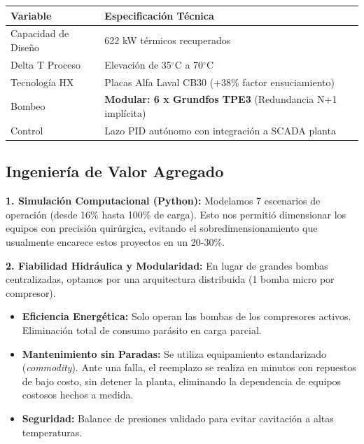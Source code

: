 \documentclass[11pt,letterpaper]{article}
\begin{document}
\begin{table}[h]
\centering
\small
\renewcommand{\arraystretch}{1.2}
\begin{tabular}{@{}ll@{}}
\toprule
\textbf{Variable} & \textbf{Especificación Técnica} \\
\midrule
Capacidad de Diseño & 622 kW térmicos recuperados \\
Delta T Proceso & Elevación de 35$^{\circ}$C a 70$^{\circ}$C \\
Tecnología HX & Placas Alfa Laval CB30 (+38\% factor ensuciamiento) \\
Bombeo & \textbf{Modular: 6 x Grundfos TPE3} (Redundancia N+1 implícita) \\
Control & Lazo PID autónomo con integración a SCADA planta \\
\bottomrule
\end{tabular}
\end{table}

\subsection{Ingeniería de Valor Agregado}

\textbf{1. Simulación Computacional (Python):}
Modelamos 7 escenarios de operación (desde 16\% hasta 100\% de carga). Esto nos permitió dimensionar los equipos con precisión quirúrgica, evitando el sobredimensionamiento que usualmente encarece estos proyectos en un 20-30\%.

\textbf{2. Fiabilidad Hidráulica y Modularidad:}
En lugar de grandes bombas centralizadas, optamos por una arquitectura distribuida (1 bomba micro por compresor).
\begin{itemize}[leftmargin=*, label=$\checkmark$]
    \item \textbf{Eficiencia Energética:} Solo operan las bombas de los compresores activos. Eliminación total de consumo parásito en carga parcial.
    \item \textbf{Mantenimiento sin Paradas:} Se utiliza equipamiento estandarizado (\textit{commodity}). Ante una falla, el reemplazo se realiza en minutos con repuestos de bajo costo, sin detener la planta, eliminando la dependencia de equipos costosos hechos a medida.
    \item \textbf{Seguridad:} Balance de presiones validado para evitar cavitación a altas temperaturas.
\end{itemize}

\newpage
\end{document}
